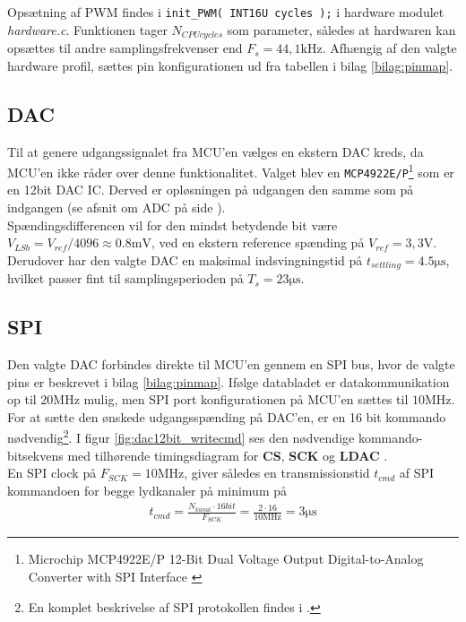 Opsætning af PWM findes i \texttt{init\_PWM( INT16U cycles );} i hardware modulet \textit{hardware.c}. 
Funktionen tager $N_{CPU cycles}$ som parameter, således at hardwaren kan opsættes til andre samplingsfrekvenser end $F_s = 44,1\si{\kilo\hertz}$.
Afhængig af den valgte hardware profil, sættes pin konfigurationen ud fra tabellen i bilag \ref{bilag:pinmap}.  

\FloatBlock

\subsection{DAC}
Til at genere udgangssignalet fra MCU'en vælges en ekstern DAC kreds, da MCU'en ikke råder over denne funktionalitet.
Valget blev en \texttt{MCP4922E/P}\footnote{Microchip MCP4922E/P 12-Bit Dual Voltage Output Digital-to-Analog Converter with SPI Interface \cite{mcp4922} } som er en 12bit DAC IC.
Derved er opløsningen på udgangen den samme som på indgangen (se afsnit om ADC på side \pageref{subsec:adc}).\\

Spændingsdifferencen vil for den mindst betydende bit være $ V_{LSb} = V_{ref} / 4096 \approx \num{0,8}\si{\milli\volt} $, ved en ekstern reference spænding på $V_{ref} = 3,3\si{\volt}$.
Derudover har den valgte DAC en maksimal indsvingningstid på $t_{settling} = \num{4.5}\si{\micro\second}$, hvilket passer fint til samplingsperioden på $T_s = 23\si{\micro\second}$. 

\subsection{SPI}
Den valgte DAC forbindes direkte til MCU'en gennem en SPI bus, hvor de valgte pins er beskrevet i bilag \ref{bilag:pinmap}.
Ifølge databladet er datakommunikation op til $20\si{\mega\hertz}$ mulig, men SPI port konfigurationen på MCU'en sættes til $10\si{\mega\hertz}$.
For at sætte den ønskede udgangsspænding på DAC'en, er en 16 bit kommando nødvendig\footnote{En komplet beskrivelse af SPI protokollen findes i \cite[s. 23]{mcp4922}.}. 
I figur \ref{fig:dac12bit_writecmd} ses den nødvendige kommando-bitsekvens med tilhørende timingsdiagram for \textbf{CS}, \textbf{SCK} og \textbf{LDAC}  .\\

En SPI clock på $F_{SCK} = 10\si{\mega\hertz}$, giver således en transmissionstid $t_{cmd}$ af SPI kommandoen for begge lydkanaler på minimum på 
\begin{align}
	t_{cmd} = \frac{N_{kanal} \cdot 16bit}{F_{SCK}} = \frac{2 \cdot 16}{10\si{\mega\hertz}} = 3\si{\micro\second}
\end{align}

